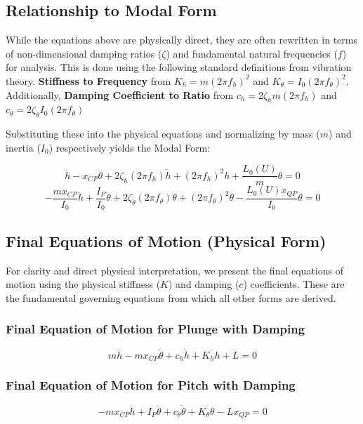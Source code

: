 \documentclass{article}
\begin{document}
\subsection{Relationship to Modal Form}
While the equations above are physically direct, they are often rewritten in terms of non-dimensional damping ratios ($\zeta$) and fundamental natural frequencies ($f$) for analysis. This is done using the following standard definitions from vibration theory. \textbf{Stiffness to Frequency} from $K_h = m(2\pi f_h)^2$ and $K_\theta = I_0(2\pi f_\theta)^2$. Additionally, \textbf{Damping Coefficient to Ratio} from $c_h = 2\zeta_h m(2\pi f_h)$ and $c_\theta = 2\zeta_\theta I_0(2\pi f_\theta)$


Substituting these into the physical equations and normalizing by mass ($m$) and inertia ($I_0$) respectively yields the Modal Form:

    $$
    \ddot{h} - x_{CP}\ddot{\theta} + 2\zeta_h (2\pi f_h)\dot{h} + (2\pi f_h)^2 h + \frac{L_0(U)}{m}\theta = 0
    $$
    $$
    -\frac{mx_{CP}}{I_0}\ddot{h} + \frac{I_P}{I_0}\ddot{\theta} + 2\zeta_\theta (2\pi f_\theta)\dot{\theta} + (2\pi f_\theta)^2\theta - \frac{L_0(U)x_{QP}}{I_0}\theta = 0
    $$

\subsection{Final Equations of Motion (Physical Form)}
For clarity and direct physical interpretation, we present the final equations of motion using the physical stiffness ($K$) and damping ($c$) coefficients. These are the fundamental governing equations from which all other forms are derived.

\subsubsection{Final Equation of Motion for Plunge with Damping}
\begin{equation}
\boxed{
m\ddot{h} - mx_{CP}\ddot{\theta} + c_h\dot{h} + K_h h + L = 0
}
\end{equation}

\subsubsection{Final Equation of Motion for Pitch with Damping}
\begin{equation}
\boxed{
-mx_{CP}\ddot{h} + I_P\ddot{\theta} + c_\theta\dot{\theta} + K_\theta\theta - Lx_{QP} = 0
}
\end{equation}
\end{document}
